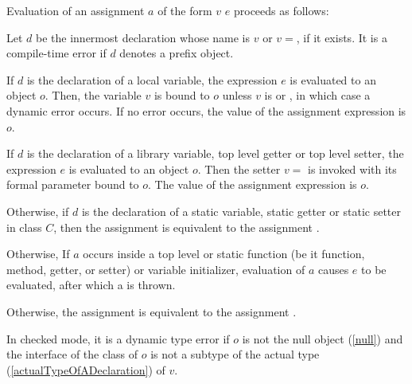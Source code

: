 \documentclass{article}
\begin{document}
\LMHash{}
Evaluation of an assignment $a$ of the form $v$ \code{=} $e$ proceeds as follows:



\LMHash{}
Let $d$ be the innermost declaration whose name is $v$ or $v=$, if it exists.
It is a compile-time error if $d$ denotes a prefix object.

\LMHash{}
If $d$ is the declaration of a local variable, the expression $e$ is evaluated to an object $o$.
Then, the variable $v$ is bound to $o$ unless $v$ is \FINAL{} or \CONST{}, in which case a dynamic error occurs.
If no error occurs, the value of the assignment expression is $o$.


\LMHash{}
If $d$ is the declaration of a library variable, top level getter or top level setter, the expression $e$ is evaluated to an object $o$.
Then the setter $v=$ is invoked with its formal parameter bound to $o$.
The value of the assignment expression is $o$.

\LMHash{}
Otherwise, if $d$ is the declaration of a static variable, static getter or static setter in class $C$, then the assignment is equivalent to the assignment .

\LMHash{}
Otherwise, If $a$ occurs inside a top level or static function (be it function, method, getter, or setter) or variable initializer, evaluation of $a$ causes $e$ to be evaluated, after which a  is thrown.

\LMHash{}
Otherwise, the assignment is equivalent to the assignment .

\LMHash{}
In checked mode, it is a dynamic type error if $o$ is not the null object (\ref{null}) and the interface of the class of $o$ is not a subtype of the actual type (\ref{actualTypeOfADeclaration}) of $v$.
\end{document}
